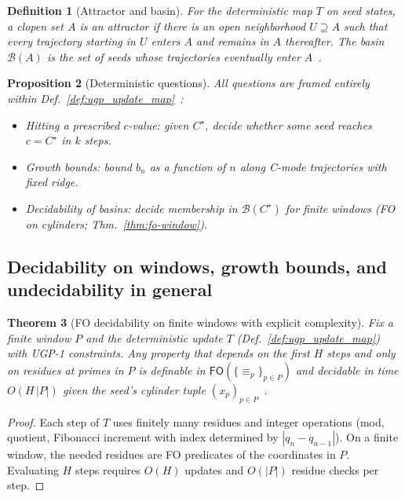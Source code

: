 \documentclass[12pt]{article}
\newtheorem{theorem}{Theorem}[section]
\newtheorem{proposition}[theorem]{Proposition}
\newtheorem{definition}[theorem]{Definition}
\numberwithin{equation}{section}
\begin{document}
\begin{definition}[Attractor and basin]\label{def:attractor}
For the deterministic map $T$ on seed states, a clopen set $A$ is an \emph{attractor} if there is an open neighborhood $U\supseteq A$ such that every trajectory starting in $U$ enters $A$ and remains in $A$ thereafter. The \emph{basin} $\mathcal{B}(A)$ is the set of seeds whose trajectories eventually enter $A$~\cite{SpivackUGPFormalization,ugp-lean}.
\end{definition}

\begin{proposition}[Deterministic questions]\label{prob:deterministic}
All questions are framed entirely within Def.~\ref{def:ugp_update_map}~\cite{SpivackUGPFormalization,ugp-lean}:
\begin{itemize}[leftmargin=1.1em]
\item \emph{Hitting} a prescribed $c$-value: given $C^\star$, decide whether some seed reaches $c=C^\star$ in $k$ steps.
\item \emph{Growth bounds}: bound $b_n$ as a function of $n$ along C-mode trajectories with fixed ridge.
\item \emph{Decidability of basins}: decide membership in $\mathcal{B}(C^\star)$ for finite windows (FO on cylinders; Thm.~\ref{thm:fo-window}).
\end{itemize}
\end{proposition}

\subsection{Decidability on windows, growth bounds, and undecidability in general}\label{subsec:J35}
\begin{theorem}[FO decidability on finite windows with explicit complexity]\label{thm:j35-fo}
Fix a finite window $P$ and the deterministic update $T$ (Def.~\ref{def:ugp_update_map}) with UGP-1 constraints. Any property that depends on the first $H$ steps and only on residues at primes in $P$ is definable in $\mathsf{FO}(\{\equiv_p\}_{p\in P})$ and decidable in time $O(H\,|P|)$ given the seed's cylinder tuple $(x_p)_{p\in P}$~\cite{SpivackUGPFormalization,ugp-lean}.
\end{theorem}
\begin{proof}
Each step of $T$ uses finitely many residues and integer operations (mod, quotient, Fibonacci increment with index determined by $|q_n-q_{n-1}|$). On a finite window, the needed residues are FO predicates of the coordinates in $P$. Evaluating $H$ steps requires $O(H)$ updates and $O(|P|)$ residue checks per step.
\end{proof}
\end{document}
